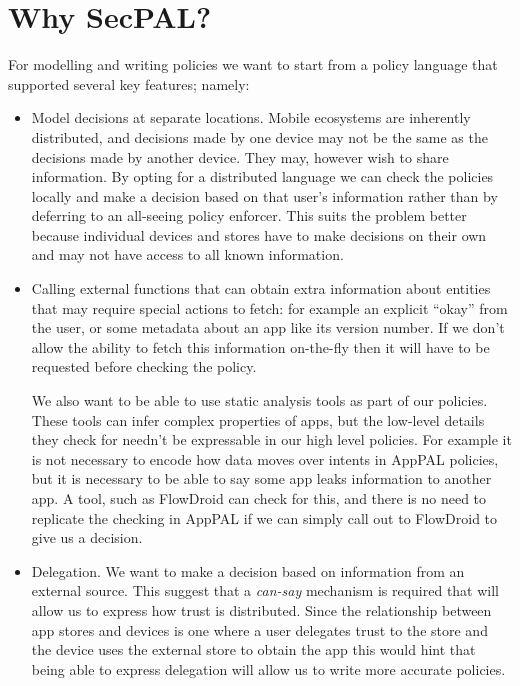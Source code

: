 \documentclass[thesis.tex]{subfiles}
\begin{document}
\section{Why SecPAL?}

For modelling and writing policies we want to start from a policy
language that supported several key features; namely:

\begin{itemize}
  \item Model decisions at separate locations.  Mobile ecosystems are
    inherently distributed, and decisions made by one device may not be
    the same as the decisions made by another device.  They may, however
    wish to share information.  By opting for a distributed language we
    can check the policies locally and make a decision based on that
    user's information rather than by deferring to an all-seeing policy
    enforcer.  This suits the problem better because individual devices
    and stores have to make decisions on their own and may not have access
    to all known information.

  \item Calling external functions that can obtain extra information
    about entities that may require special actions to fetch: for example
    an explicit ``okay'' from the user, or some metadata about an app like
    its version number.  If we don't allow the ability to fetch this
    information on-the-fly then it will have to be requested before
    checking the policy. 

    We also want to be able to use static analysis tools as part of
    our policies.  These tools can infer complex properties of apps, but
    the low-level details they check for needn't be expressable in our
    high level policies.  For example it is not necessary to encode how
    data moves over intents in AppPAL policies, but it is necessary to be
    able to say some app leaks information to another app.  A tool, such
    as FlowDroid can check for this, and there is no need to replicate the
    checking in AppPAL if we can simply call out to FlowDroid to give us a
    decision.

  \item Delegation.  We want to make a decision based on information from an
    external source.  This suggest that a \emph{can-say} mechanism is required
    that will allow us to express how trust is distributed.   Since the
    relationship between app stores and devices is one where a user delegates
    trust to the store and the device uses the external store to obtain the app
    this would hint that being able to express delegation will allow us to write
    more accurate policies.
\end{itemize}
\end{document}
